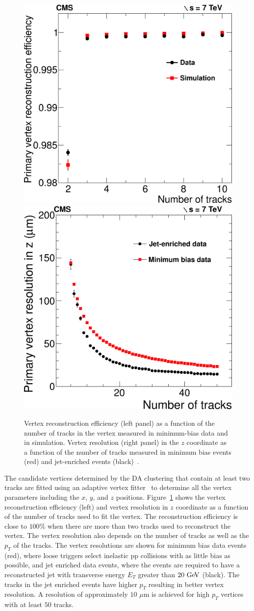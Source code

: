 \begin{figure}[h]
\centering
\includegraphics[width=0.49\columnwidth]{figures_chapter4/vertex_efficiency}
\includegraphics[width=0.49\columnwidth]{figures_chapter4/vertex_resolution}
\caption{Vertex reconstruction efficiency (left panel) as a function of the number of tracks in the vertex measured in minimum-bias data and in simulation. Vertex resolution (right panel) in the $z$ coordinate as a function of the number of tracks measured in minimum bias events (red) and jet-enriched events (black)~\cite{Chatrchyan:2014fea}.}
\label{fig:vertex}
\end{figure}

The candidate vertices determined by the DA clustering that contain at least two tracks are fitted using an adaptive vertex fitter~\cite{0954-3899-34-12-N01} to determine all the vertex parameters including the $x$, $y$, and $z$ positions. Figure~\ref{fig:vertex} shows the vertex reconstruction efficiency (left) and vertex resolution in $z$ coordinate as a function of the number of tracks used to fit the vertex. The reconstruction efficiency is close to $100\%$ when there are more than two tracks used to reconstruct the vertex. The vertex resolution also depends on the number of tracks as well as the $p_{T}$ of the tracks. The vertex resolutions are shown for minimum bias data events (red), where loose triggers select inelastic pp collisions with as little bias as possible, and jet enriched data events, where the events are required to have a reconstructed jet with transverse energy $E_{T}$ greater than $20~\mathrm{Ge\kern -0.1em V}$ (black). The tracks in the jet enriched events have higher $p_{T}$ resulting in better vertex resolution. A resolution of approximately $10$ $\mu$m is achieved for high $p_{T}$ vertices with at least $50$ tracks.   

